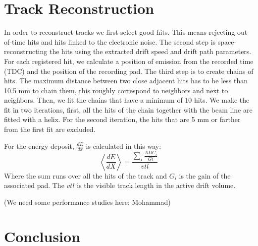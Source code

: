\documentclass[twocolumn,showpacs,superscriptaddress,groupedaddress]{revtex4}
\begin{document}
\section{Track Reconstruction}\label{sec_perf}

In order to reconstruct tracks we first select good hits. This means rejecting 
out-of-time hits and hits linked to the electronic noise. The second step is 
space-reconstructing the hits using the extracted drift speed and drift path 
parameters. For each registered hit, we calculate a position of emission from 
the recorded time (TDC) and the position of the recording pad. The third step 
is to create chains of hits. The maximum distance between two close adjacent 
hits has to be less than 10.5 mm to chain them, this roughly correspond to 
neighbors and next to neighbors. Then, we fit the chains that have a minimum of 
10 hits. We make the fit in two iterations, first, all the hits of the chain 
together with the beam line are fitted with a helix. For the second iteration, 
the hits that are 5 mm or farther from the first fit are excluded.

For the energy deposit, $\frac{dE}{dx}$ is calculated in this way:
\begin{equation}
 \left\langle \frac{dE}{dX} \right\rangle= \frac{\sum\limits_{i} \frac{ADC_{i}}{Gi}}{vtl}
\end{equation}
Where the sum runs over all the hits of the track and $G_{i}$ is the gain of 
the associated pad. The $vtl$ is the visible track length in the active drift 
volume. 

(We need some performance studies here: Mohammad)

\section{Conclusion}




  
\end{document}
